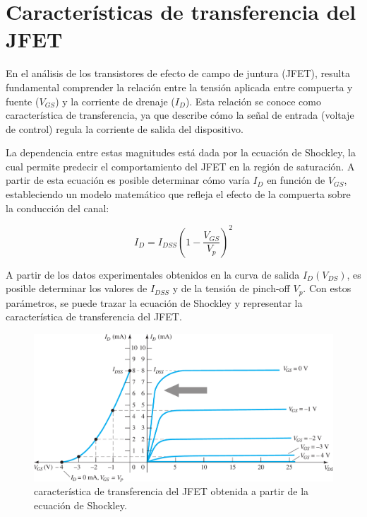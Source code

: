 \chapter{Características de transferencia del JFET}
  En el análisis de los transistores de efecto de campo de juntura (JFET), resulta fundamental comprender la relación
  entre la tensión aplicada entre compuerta y fuente (\(V_{GS}\)) y la corriente de drenaje (\(I_D\)). Esta relación se
  conoce como característica de transferencia, ya que describe cómo la señal de entrada (voltaje de control)
  regula la corriente de salida del dispositivo.  

  La dependencia entre estas magnitudes está dada por la ecuación de Shockley, la cual permite predecir el
  comportamiento del JFET en la región de saturación. A partir de esta ecuación es posible determinar cómo varía \(I_D\)
  en función de \(V_{GS}\), estableciendo un modelo matemático que refleja el efecto de la compuerta sobre la conducción
  del canal:  

  \begin{equation}
    I_D = I_{DSS} \left( 1 - \frac{V_{GS}}{V_p} \right)^2
  \end{equation}
  
  A partir de los datos experimentales obtenidos en la curva de salida \(I_D(V_{DS})\), es posible determinar los
  valores de \(I_{DSS}\) y de la tensión de pinch-off \(V_p\). Con estos parámetros, se puede trazar la ecuación de
  Shockley y representar la característica de transferencia del JFET.  
  
  \begin{figure}[!ht]
    \centering
    \includegraphics[width=1\textwidth]{images/grafico_transferencia.png}
    \caption{característica de transferencia del JFET obtenida a partir de la ecuación de Shockley.}
    \label{fig:transferencia}
  \end{figure}

